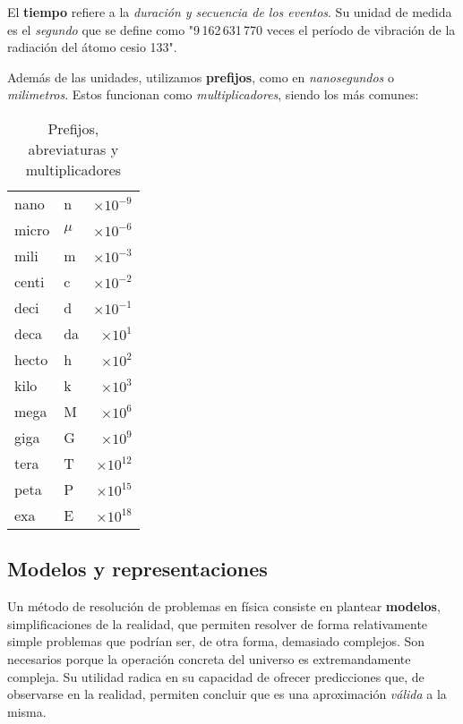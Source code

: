 El \textbf{tiempo} refiere a la \textit{duración y secuencia de los eventos}.
Su unidad de medida es el \textit{segundo} que se define como
"9\,162\,631\,770 veces el período de vibración de la radiación del átomo
cesio 133".

Además de las unidades,
utilizamos \textbf{prefijos},
como en \textit{nanosegundos} o \textit{milimetros}.
Estos funcionan como \textit{multiplicadores},
siendo los más comunes:

\vspace{.5cm}
\begin{table}[H]
    \centering
    \caption{Prefijos, abreviaturas y multiplicadores}
    \vspace{.5cm}
    \begin{tabular}{llr}
        \hline
        nano  & n       & \(\times10^{-9}\) \\
        micro & \(\mu\) & \(\times10^{-6}\) \\
        mili  & m       & \(\times10^{-3}\) \\
        centi & c       & \(\times10^{-2}\) \\
        deci  & d       & \(\times10^{-1}\) \\
        deca  & da      & \(\times10^{1}\)  \\
        hecto & h       & \(\times10^{2}\)  \\
        kilo  & k       & \(\times10^{3}\)  \\
        mega  & M       & \(\times10^{6}\)  \\
        giga  & G       & \(\times10^{9}\)  \\
        tera  & T       & \(\times10^{12}\) \\
        peta  & P       & \(\times10^{15}\) \\
        exa   & E       & \(\times10^{18}\) \\
        \hline
    \end{tabular}
\end{table}
\vspace{.5cm}

\subsection{Modelos y representaciones}

Un método de resolución de problemas en física consiste en plantear \textbf{modelos},
simplificaciones de la realidad,
que permiten resolver de forma relativamente simple problemas que podrían ser, 
de otra forma, demasiado complejos.
Son necesarios porque la operación concreta del universo 
es extremandamente compleja.
Su utilidad radica en su capacidad de ofrecer predicciones que,
de observarse en la realidad,
permiten concluir que es una aproximación \textit{válida} a la misma.

